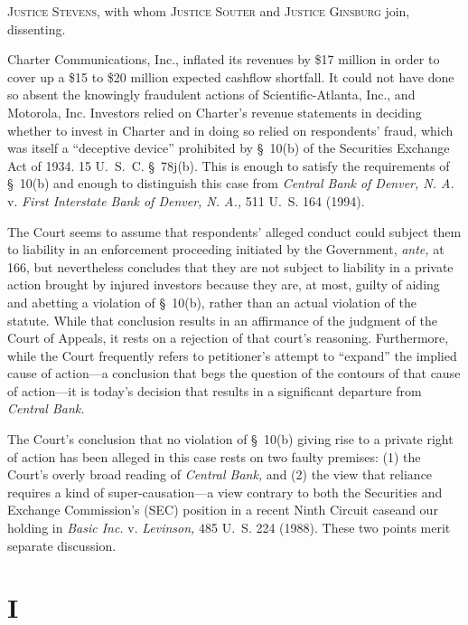 
\setcounter{page}{167}

  \textsc{Justice Stevens,} with whom \textsc{Justice Souter} and \textsc{Justice Ginsburg} join, dissenting.

  Charter Communications, Inc., inflated its revenues by \$17 million in order to cover up a \$15 to \$20 million expected cashflow shortfall. It could not have done so absent the knowingly fraudulent actions of Scientific-Atlanta, Inc., and Motorola, Inc. Investors relied on Charter's revenue statements in deciding whether to invest in Charter and in doing so relied on respondents' fraud, which was itself a ``deceptive device'' prohibited by \S~10(b) of the Securities Exchange Act of 1934. 15 U.~S.~C. \S~78j(b). This is enough to satisfy the requirements of \S~10(b) and enough to distinguish this case from \emph{Central Bank of Denver, N. A.} v. \emph{First Interstate Bank of Denver, N. A.,} 511 U.~S. 164 (1994).

  The Court seems to assume that respondents' alleged conduct could subject them to liability in an enforcement proceeding initiated by the Government, \emph{ante,} at 166, but nevertheless concludes that they are not subject to liability in a private action brought by injured investors because they are, at most, guilty of aiding and abetting a violation of \S~10(b), \newpage  rather than an actual violation of the statute. While that conclusion results in an affirmance of the judgment of the Court of Appeals, it rests on a rejection of that court's reasoning. Furthermore, while the Court frequently refers to petitioner's attempt to ``expand'' the implied cause of action\footnotemark[1] ---a conclusion that begs the question of the contours of that cause of action---it is today's decision that results in a significant departure from \emph{Central Bank.}

  The Court's conclusion that no violation of \S~10(b) giving rise to a private right of action has been alleged in this case rests on two faulty premises: (1) the Court's overly broad reading of \emph{Central Bank,} and (2) the view that reliance requires a kind of super-causation---a view contrary to both the Securities and Exchange Commission's (SEC) position in a recent Ninth Circuit case\footnotemark[2] and our holding in \emph{Basic Inc.} v. \emph{Levinson,} 485 U.~S. 224 (1988). These two points merit separate discussion.

\section{I}

